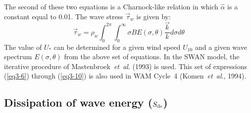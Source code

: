 \documentclass[12pt]{book}
\begin{document}
The second of these two equations is a Charnock-like relation in which $\hat{\alpha}$ is a constant equal to 0.01. The
wave stress $\vec{\tau}_w$ is given by:
\begin{equation}
  \vec{\tau}_w = \rho_w \int_{0}^{2\pi} \int_{0}^{\infty} \sigma B E (\sigma, \theta) \frac{\vec{k}}{k}
  d \sigma d \theta
  \label{eq3-10}
\end{equation}
The value of $U_*$ can be determined for a given wind speed $U_{10}$ and a given wave spectrum $E(\sigma,\theta)$ from the
above set of equations. In the SWAN model, the iterative procedure of Mastenbroek~{\it et~al}. (1993) is used.
This set of expressions (\ref{eq3-6}) through (\ref{eq3-10}) is also used in WAM Cycle~4 (Komen~{\it et~al}., 1994).


\subsection{Dissipation of wave energy ($S_{\rm ds}$)} \label{sec:dissip}
\end{document}

